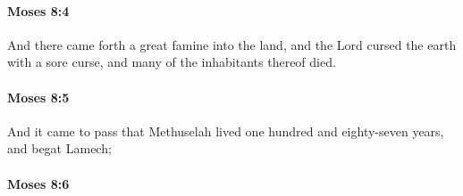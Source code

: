 
		\paragraph{Moses 8:4} %
			\label{MOSES-8-4}

			And there came forth a great famine into the land, and the Lord cursed the earth with a sore curse, and many of the inhabitants thereof died.


		\paragraph{Moses 8:5} %
			\label{MOSES-8-5}

			And it came to pass that Methuselah lived one hundred and eighty-seven years, and begat Lamech;


		\paragraph{Moses 8:6} %
			\label{MOSES-8-6}

